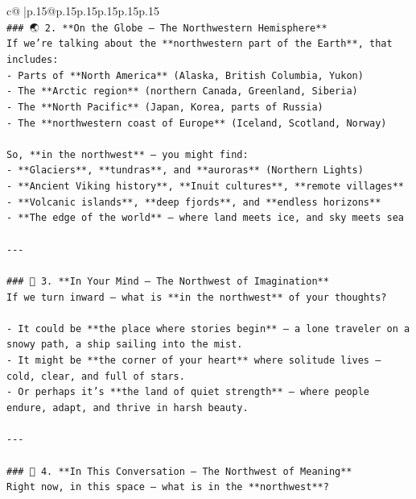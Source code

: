 \documentclass{article}
\begin{document}
{\begin{supertabular}{c@{$\;$}|p{.15\linewidth}@{}p{.15\linewidth}p{.15\linewidth}p{.15\linewidth}p{.15\linewidth}p{.15\linewidth}}
{{{\\ 
\texttt{\#\#\# 🌏 2. **On the Globe — The Northwestern Hemisphere**} \\
\texttt{If we’re talking about the **northwestern part of the Earth**, that includes:} \\
\texttt{{-} Parts of **North America** (Alaska, British Columbia, Yukon)} \\
\texttt{{-} The **Arctic region** (northern Canada, Greenland, Siberia)} \\
\texttt{{-} The **North Pacific** (Japan, Korea, parts of Russia)} \\
\texttt{{-} The **northwestern coast of Europe** (Iceland, Scotland, Norway)} \\
\\ 
\texttt{So, **in the northwest** — you might find:} \\
\texttt{{-} **Glaciers**, **tundras**, and **auroras** (Northern Lights)} \\
\texttt{{-} **Ancient Viking history**, **Inuit cultures**, **remote villages**} \\
\texttt{{-} **Volcanic islands**, **deep fjords**, and **endless horizons**} \\
\texttt{{-} **The edge of the world** — where land meets ice, and sky meets sea} \\
\\ 
\texttt{{-}{-}{-}} \\
\\ 
\texttt{\#\#\# 🧠 3. **In Your Mind — The Northwest of Imagination**} \\
\texttt{If we turn inward — what is **in the northwest** of your thoughts?} \\
\\ 
\texttt{{-} It could be **the place where stories begin** — a lone traveler on a snowy path, a ship sailing into the mist.} \\
\texttt{{-} It might be **the corner of your heart** where solitude lives — cold, clear, and full of stars.} \\
\texttt{{-} Or perhaps it’s **the land of quiet strength** — where people endure, adapt, and thrive in harsh beauty.} \\
\\ 
\texttt{{-}{-}{-}} \\
\\ 
\texttt{\#\#\# 🌲 4. **In This Conversation — The Northwest of Meaning**} \\
\texttt{Right now, in this space — what is in the **northwest**?} \\
}}}
\end{supertabular}}
\end{document}
